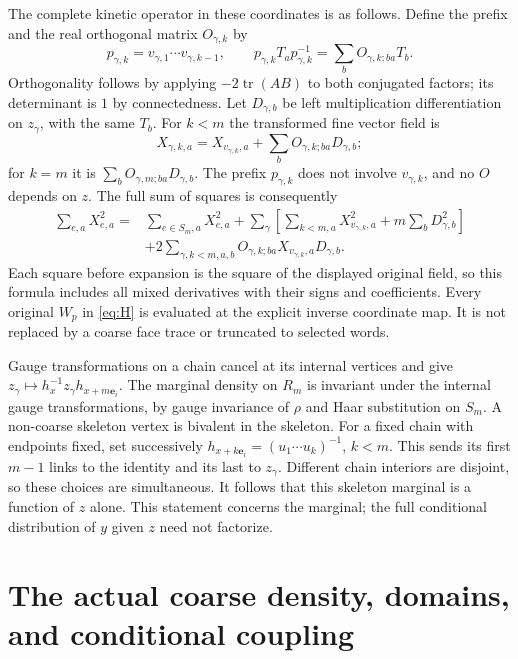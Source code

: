 \documentclass[11pt]{article}
\newcommand{\tr}{\operatorname{tr}}
\begin{document}
The complete kinetic operator in these coordinates is as follows.
Define the prefix and the real
orthogonal matrix $O_{\gamma,k}$ by
\[
 p_{\gamma,k}=v_{\gamma,1}\cdots v_{\gamma,k-1},\qquad
 p_{\gamma,k}T_a p_{\gamma,k}^{-1}
   =\sum_b O_{\gamma,k;ba}T_b.
\]
Orthogonality follows by applying $-2\tr(AB)$ to both conjugated factors;
its determinant is $1$ by connectedness. Let $D_{\gamma,b}$ be left
multiplication differentiation on $z_\gamma$, with the same $T_b$.
For $k<m$ the transformed fine vector field is
\[
 X_{\gamma,k,a}=X_{v_{\gamma,k},a}
            +\sum_bO_{\gamma,k;ba}D_{\gamma,b};
\]
for $k=m$ it is $\sum_bO_{\gamma,m;ba}D_{\gamma,b}$. The prefix
$p_{\gamma,k}$ does not involve $v_{\gamma,k}$, and no $O$ depends on $z$.
The full sum of squares is consequently
\begin{align}\label{eq:fulltensor}
 \sum_{e,a}X_{e,a}^2
 ={}&\sum_{e\in S_m,a}X_{e,a}^2
 +\sum_{\gamma}\left[\sum_{k<m,a}X_{v_{\gamma,k},a}^2
                      +m\sum_bD_{\gamma,b}^2\right]\nonumber\\
 &+2\sum_{\gamma,k<m,a,b}O_{\gamma,k;ba}
                    X_{v_{\gamma,k},a}D_{\gamma,b}.
\end{align}
Each square before expansion is the square of the displayed original
field, so this formula includes all mixed derivatives with their signs
and coefficients. Every original $W_p$ in \eqref{eq:H} is evaluated at
the explicit inverse coordinate map. It is not replaced by a coarse face
trace or truncated to selected words.

Gauge transformations on a chain cancel at its internal vertices and give
$z_\gamma\mapsto h_x^{-1}z_\gamma h_{x+m\mathbf e_i}$.
The marginal density on $R_m$ is invariant under the internal gauge
transformations, by gauge invariance of $\rho$ and Haar substitution on
$S_m$. A non-coarse skeleton vertex is bivalent in the skeleton. For a
fixed chain with endpoints fixed, set successively
$h_{x+k\mathbf e_i}=(u_1\cdots u_k)^{-1}$, $k<m$.
This sends its first $m-1$ links to the identity and its last to $z_\gamma$.
Different chain interiors are disjoint, so these choices are simultaneous.
It follows that this skeleton marginal is a function of $z$ alone.
This statement concerns the marginal; the full conditional distribution
of $y$ given $z$ need not factorize.

\section{The actual coarse density, domains, and conditional coupling}
\end{document}
